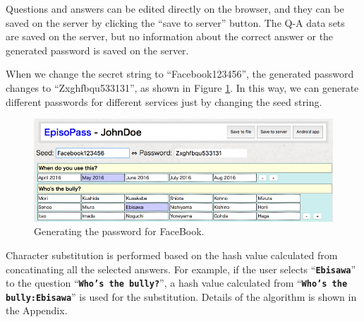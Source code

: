 \documentclass{sigchi}
\begin{document}
Questions and answers can be edited directly on the browser, and they can be
saved on the server by clicking the ``save to server'' button.
The Q-A data sets are saved on the server,
but no information about the correct answer or the
generated password is saved on the server.


When we change the secret string to ``\textsf{Facebook123456}'',
the generated password changes to ``\textsf{Zxghfbqu533131}'',
as shown in Figure \ref{web2}.
In this way, we can generate different passwords for
different services just by changing the seed string.

\begin{figure}[H]
\centering
\includegraphics[width=1.0\columnwidth]{figures/0e2820c279afc70520482e0fc53b6ed9}
\caption{Generating the password for FaceBook.}
\label{web2}
\end{figure}



Character substitution is performed based on the hash value
calculated from concatinating all the selected answers.
For example, if the user selects ``\textbf{\texttt{Ebisawa}}'' to the question ``\textbf{\texttt{Who's the bully?}}'',
a hash value calculated from  ``\textbf{\texttt{Who's the bully:Ebisawa}}''
is used for the substitution.
Details of the algorithm is shown in the Appendix.

\end{document}
